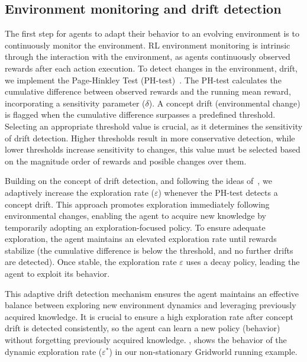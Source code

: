 \subsection{Environment monitoring and drift detection}

The first step for agents to adapt their behavior to an evolving environment is to continuously monitor 
the environment. \ac{RL} environment monitoring is intrinsic through the interaction with the 
environment, as agents continuously observed rewards after each action execution. To detect 
changes in the environment, \ie drift, we implement the Page-Hinkley Test (PH-test)~\cite{mignon2017adaptive,networkdynamicrl}. The PH-test calculates the cumulative difference between observed rewards and the running mean reward, incorporating a sensitivity parameter ($\delta$). A concept drift (environmental change) is flagged when the cumulative 
difference surpasses a predefined threshold. Selecting an appropriate threshold value is crucial, as it 
determines the sensitivity of drift detection. Higher thresholds result in more conservative detection, 
while lower thresholds increase sensitivity to changes, this value must be selected based on the 
magnitude order of rewards and posible changes over them.

Building on the concept of drift detection, and following the ideas of~\citet{mignon2017adaptive}, 
we adaptively increase the exploration rate ($\varepsilon$) whenever the PH-test detects a concept 
drift. This approach promotes exploration immediately following environmental changes, enabling 
the agent to acquire new knowledge by temporarily adopting an exploration-focused policy. To 
ensure adequate exploration, the agent maintains an elevated exploration rate until rewards 
stabilize (\ie the cumulative difference is below the threshold, and  no further drifts are detected). 
Once stable, the exploration rate $\varepsilon$ uses a decay policy, leading the agent to exploit its 
behavior.

This adaptive drift detection mechanism ensures the agent maintains an effective balance between 
exploring new environment dynamics and leveraging previously acquired knowledge. It is crucial to 
ensure a high exploration rate after concept drift is detected consistently, so the agent can learn a 
new policy (\ie behavior) without forgetting previously acquired knowledge. , 
shows the behavior of the dynamic exploration rate ($\varepsilon^*$) in our non-stationary Gridworld 
running example.

